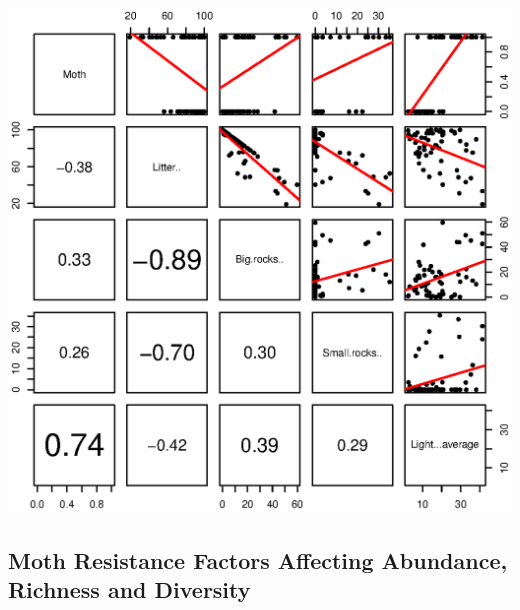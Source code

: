 \documentclass[a4paper]{article}
\begin{document}
\includegraphics{SCRL_tex-014}

\subsection{Moth Resistance Factors Affecting Abundance, Richness and Diversity}
\end{document}

